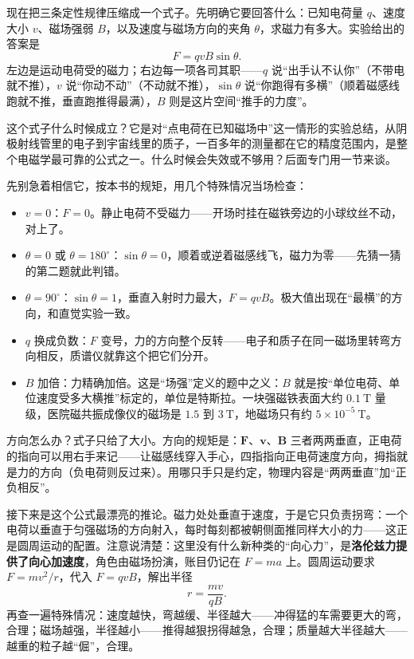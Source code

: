 \begin{mainline}
现在把三条定性规律压缩成一个式子。先明确它要回答什么：已知电荷量 \(q\)、速度大小 \(v\)、磁场强弱 \(B\)，以及速度与磁场方向的夹角 \(\theta\)，求磁力有多大。实验给出的答案是
\[
F=qvB\sin\theta .
\]
左边是运动电荷受的磁力；右边每一项各司其职——\(q\) 说“出手认不认你”（不带电就不推），\(v\) 说“你动不动”（不动就不推），\(\sin\theta\) 说“你跑得有多横”（顺着磁感线跑就不推，垂直跑推得最满），\(B\) 则是这片空间“推手的力度”。

这个式子什么时候成立？它是对“点电荷在已知磁场中”这一情形的实验总结，从阴极射线管里的电子到宇宙线里的质子，一百多年的测量都在它的精度范围内，是整个电磁学最可靠的公式之一。什么时候会失效或不够用？后面专门用一节来谈。

先别急着相信它，按本书的规矩，用几个特殊情况当场检查：

\begin{itemize}
  \item \(v=0\)：\(F=0\)。静止电荷不受磁力——开场时挂在磁铁旁边的小球纹丝不动，对上了。
  \item \(\theta=0\) 或 \(\theta=180^\circ\)：\(\sin\theta=0\)，顺着或逆着磁感线飞，磁力为零——先猜一猜的第二题就此判错。
  \item \(\theta=90^\circ\)：\(\sin\theta=1\)，垂直入射时力最大，\(F=qvB\)。极大值出现在“最横”的方向，和直觉实验一致。
  \item \(q\) 换成负数：\(F\) 变号，力的方向整个反转——电子和质子在同一磁场里转弯方向相反，质谱仪就靠这个把它们分开。
  \item \(B\) 加倍：力精确加倍。这是“场强”定义的题中之义：\(B\) 就是按“单位电荷、单位速度受多大横推”标定的，单位是特斯拉。一块强磁铁表面大约 \(0.1\ \mathrm T\) 量级，医院磁共振成像仪的磁场是 \(1.5\) 到 \(3\ \mathrm T\)，地磁场只有约 \(5\times10^{-5}\ \mathrm T\)。
\end{itemize}

方向怎么办？式子只给了大小。方向的规矩是：\(\bm F\)、\(\bm v\)、\(\bm B\) 三者两两垂直，正电荷的指向可以用右手来记——让磁感线穿入手心，四指指向正电荷速度方向，拇指就是力的方向（负电荷则反过来）。用哪只手只是约定，物理内容是“两两垂直”加“正负相反”。

接下来是这个公式最漂亮的推论。磁力处处垂直于速度，于是它只负责拐弯：一个电荷以垂直于匀强磁场的方向射入，每时每刻都被朝侧面推同样大小的力——这正是圆周运动的配置。注意说清楚：这里没有什么新种类的“向心力”，是\textbf{洛伦兹力提供了向心加速度}，角色由磁场扮演，账目仍记在 \(F=ma\) 上。圆周运动要求 \(F=mv^2/r\)，代入 \(F=qvB\)，解出半径
\[
r=\frac{mv}{qB}.
\]
再查一遍特殊情况：速度越快，弯越缓、半径越大——冲得猛的车需要更大的弯，合理；磁场越强，半径越小——推得越狠拐得越急，合理；质量越大半径越大——越重的粒子越“倔”，合理。


\end{mainline}
